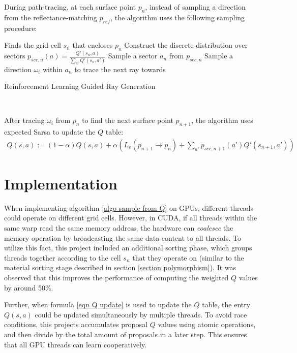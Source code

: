 During path-tracing, at each surface point $p_n$, instead of sampling a direction from the reflectance-matching $p_{ref}$, the algorithm uses the following sampling procedure:

\begin{algorithm}[H]
    \label{algo sample from Q}
    Finds the grid cell $s_n$ that encloses $p_n$\;
    Construct the discrete distribution over sectors $p_{sec,n}(a)=\frac{Q'(s_n,a)}{\sum_{a'}Q'(s_n,a')}$\;
    Sample a sector $a_n$ from $p_{sec,n}$\;
    Sample a direction $\omega_i$ within $a_n$ to trace the next ray towards\;
    \caption{Reinforcement Learning Guided Ray Generation}
\end{algorithm} 

~

After tracing $\omega_i$ from $p_n$ to find the next surface point $p_{n+1}$, the algorithm uses expected Sarsa to update the $Q$ table:
\begin{align}
    \label{eqn Q update}
    Q(s,a) := (1-\alpha) Q(s,a) + \alpha  \left(L_e(p_{n+1}\to p_n)+ \sum_{a'} p_{sec,n+1}(a')  Q'(s_{n+1},a')\right)
\end{align}

\section{Implementation}
When implementing algorithm \ref{algo sample from Q} on GPUs, different threads could operate on different grid cells. However, in CUDA, if all threads within the same warp read the same memory address, the hardware can \textit{coalesce} the memory operation by broadcasting the same data content to all threads. To utilize this fact, this project included an additional sorting phase, which groups threads together according to the cell $s_n$ that they operate on (similar to the material sorting stage described in section \ref{section polymorphism}). It was observed that this improves the performance of computing the weighted $Q$ values by around 50\%.

Further, when formula \ref{eqn Q update} is used to update the $Q$ table, the entry $Q(s,a)$ could be updated simultaneously by multiple threads. To avoid race conditions, this projects accumulates proposal $Q$ values using atomic operations, and then divide by the total amount of proposals in a later step. This ensures that all GPU threads can learn cooperatively. 

